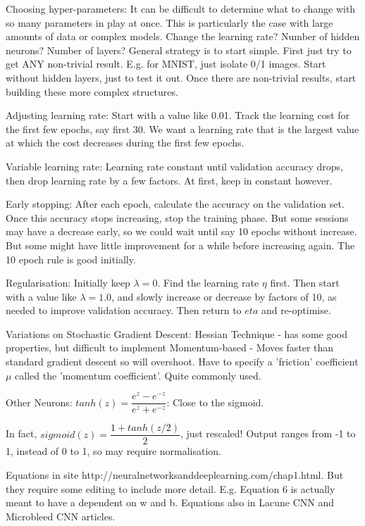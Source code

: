 \documentclass[honours,12pt]{unswthesis}
\numberwithin{equation}{section}
\begin{document}
Choosing hyper-parameters:
It can be difficult to determine what to change with so many parameters in play at once. This is particularly the case with large amounts of data or complex models. Change the learning rate? Number of hidden neurons? Number of layers? 
General strategy is to start simple. First just try to get ANY non-trivial result. E.g. for MNIST, just isolate 0/1 images. Start without hidden layers, just to test it out. Once there are non-trivial results, start building these more complex structures.

Adjusting learning rate:
Start with a value like 0.01. Track the learning cost for the first few epochs, say first 30. We want a learning rate that is the largest value at which the cost decreases during the first few epochs.

Variable learning rate:
Learning rate constant until validation accuracy drops, then drop learning rate by a few factors. At first, keep in constant however.

Early stopping:
After each epoch, calculate the accuracy on the validation set. Once this accuracy stops increasing, stop the training phase. But some sessions may have a decrease early, so we could wait until say 10 epochs without increase. But some might have little improvement for a while before increasing again. The 10 epoch rule is good initially.

Regularisation:
Initially keep $\lambda = 0$. Find the learning rate $\eta$ first. Then start with a value like $\lambda = 1.0$, and slowly increase or decrease by factors of 10, as needed to improve validation accuracy. Then return to $eta$ and re-optimise.

Variations on Stochastic Gradient Descent:
Hessian Technique - has some good properties, but difficult to implement
Momentum-based - Moves faster than standard gradient descent so will overshoot. Have to specify a 'friction' coefficient $\mu$ called the 'momentum coefficient'. Quite commonly used.

Other Neurons:
$tanh(z) = \dfrac{e^z - e^{-z}}{e^z + e^{-z}}$: Close to the sigmoid.

In fact, $sigmoid(z) = \dfrac{1 + tanh(z/2)}{2}$, just rescaled! Output ranges from -1 to 1, instead of 0 to 1, so may require normalisation.

Equations in site http://neuralnetworksanddeeplearning.com/chap1.html. But they require some editing to include more detail. E.g. Equation 6 is actually meant to have a dependent on w and b.
Equations also in Lacune CNN and Microbleed CNN articles.
\end{document}

